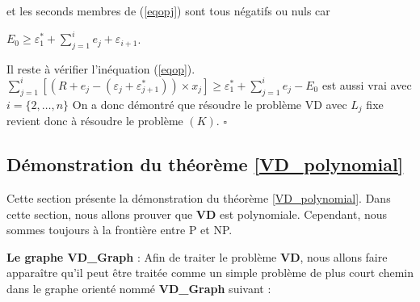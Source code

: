 et les seconds membres de (\ref{eqopj}) sont tous négatifs ou nuls car 

$E_0 \geq \varepsilon_{1}^*+ \sum_{j=1}^{i}e_j+\varepsilon_{i+1}$.


Il reste à vérifier l'inéquation (\ref{eqop}).  
$ \sum_{j=1}^{i}[(R + e_j- (\varepsilon_{j}+\varepsilon_{j+1}^*)) \times x_j]   \geq  \varepsilon_{1}^*+ \sum_{j=1}^{i}e_j -E_0 $ est aussi vrai avec $i=\{2, \dots, n\}$
On a donc démontré que résoudre le problème VD avec $L_j$ fixe revient donc à résoudre le problème $(K)$.  $\square$


\subsection{Démonstration du théorème \ref{VD_polynomial}}
\label{VD_polynomial_section}
Cette section présente la démonstration du théorème \ref{VD_polynomial}.
Dans cette section, nous allons prouver que \textbf{VD} est polynomiale. Cependant, nous sommes toujours à la frontière entre P et NP.

\textbf{Le graphe VD\_Graph} : Afin de traiter le problème \textbf{VD}, nous allons faire apparaître qu'il peut être traitée comme un simple problème de plus court chemin dans le graphe orienté nommé \textbf{VD\_Graph} suivant :

